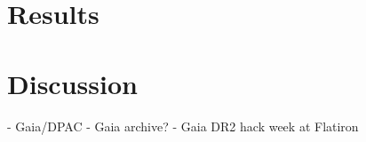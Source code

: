 \documentclass[twocolumn]{aastex61}
\begin{document}










\section{Results}


\section{Discussion}




\acknowledgements
- Gaia/DPAC
- Gaia archive?
- Gaia DR2 hack week at Flatiron
\end{document}
